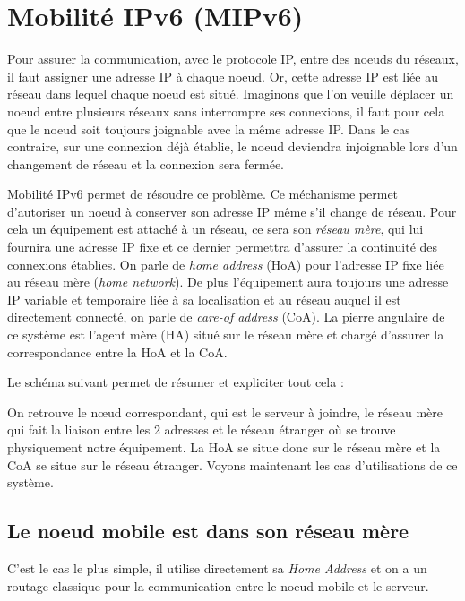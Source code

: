 \section{Mobilité IPv6 (MIPv6)}

Pour assurer la communication, avec le protocole IP, entre des noeuds du réseaux, il faut assigner une adresse IP à chaque noeud.
Or, cette adresse IP est liée au réseau dans lequel chaque noeud est situé.
Imaginons que l'on veuille déplacer un noeud entre plusieurs réseaux sans interrompre ses connexions, il faut pour cela que le noeud soit toujours joignable avec la même adresse IP.
Dans le cas contraire, sur une connexion déjà établie, le noeud deviendra injoignable lors d'un changement de réseau et la connexion sera fermée.

Mobilité IPv6 permet de résoudre ce problème.
Ce méchanisme permet d'autoriser un noeud à conserver son adresse IP même s'il change de réseau.
Pour cela un équipement est attaché à un réseau, ce sera son \emph{réseau mère}, qui lui fournira une adresse IP fixe et ce dernier permettra d’assurer la continuité des connexions établies.
On parle de \emph{home address} (HoA) pour l’adresse IP fixe liée au réseau mère (\emph{home network}).
De plus l’équipement aura toujours une adresse IP variable et temporaire liée à sa localisation et au réseau auquel il est directement connecté, on parle de \emph{care-of address} (CoA).
La pierre angulaire de ce système est l’agent mère (HA) situé sur le réseau mère et chargé d’assurer la correspondance entre la HoA et la CoA.

Le schéma suivant permet de résumer et expliciter tout cela :


On retrouve le nœud correspondant, qui est le serveur à joindre, le réseau mère qui fait la liaison entre les 2 adresses et le réseau étranger où se trouve physiquement notre équipement.
La HoA se situe donc sur le réseau mère et la CoA se situe sur le réseau étranger.
Voyons maintenant les cas d’utilisations de ce système.

\subsection{Le noeud mobile est dans son réseau mère}

C’est le cas le plus simple, il utilise directement sa \emph{Home Address} et on a un routage classique pour la communication entre le noeud mobile et le serveur.

